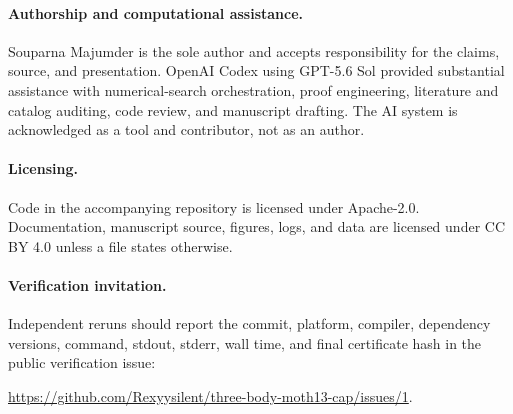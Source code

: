 \documentclass[11pt]{article}
\begin{document}
\paragraph{Authorship and computational assistance.}
Souparna Majumder is the sole author and accepts responsibility for the claims, source, and presentation. OpenAI Codex using GPT-5.6 Sol provided substantial assistance with numerical-search orchestration, proof engineering, literature and catalog auditing, code review, and manuscript drafting. The AI system is acknowledged as a tool and contributor, not as an author.

\paragraph{Licensing.}
Code in the accompanying repository is licensed under Apache-2.0. Documentation, manuscript source, figures, logs, and data are licensed under CC BY 4.0 unless a file states otherwise.

\paragraph{Verification invitation.}
Independent reruns should report the commit, platform, compiler, dependency versions, command, stdout, stderr, wall time, and final certificate hash in the public verification issue:
\begin{center}
\url{https://github.com/Rexyysilent/three-body-moth13-cap/issues/1}.
\end{center}



\end{document}
